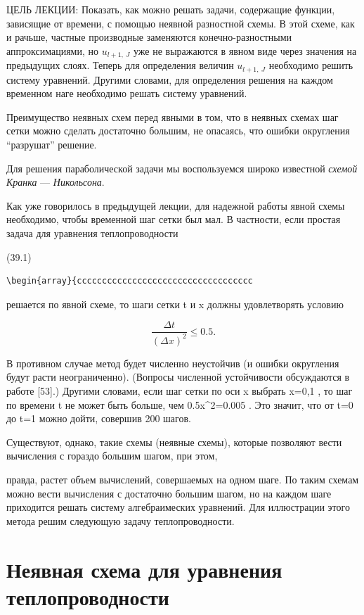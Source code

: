 \documentclass[
  ukrainian,
]{article}
\begin{document}
ЦЕЛЬ ЛЕКЦИИ: Показать, как можно решать задачи, содержащие функции,
зависящие от времени, с помощью неявной разностной схемы. В этой схеме,
как и рачьше, частные производные заменяются конечно-разностными
аппроксимациями, но \(u_{l+1,\ J}\) уже не выражаются в явном виде через
значения на предыдущих слоях. Теперь для определения величин
\(u_{l+1,\ J}\) необходимо решить систему уравнений. Другими словами,
для определения решения на каждом временном наге необходимо решать
систему уравнений.

Преимущество неявных схем перед явными в том, что в неявных схемах шаг
сетки можно сделать достаточно большим, не опасаясь, что ошибки
округления ``разрушат'' решение.

Для решения параболической задачи мы воспользуемся широко известной
\emph{схемой Кранка} --- \emph{Никольсона}.

Как уже говорилось в предыдущей лекции, для надежной работы явной схемы
необходимо, чтобы временной шаг сетки был мал. В частности, если простая
задача для уравнения теплопроводности

(39.1)

\begin{verbatim}
\begin{array}{ccccccccccccccccccccccccccccccccccc
\end{verbatim}

решается по явной схеме, то шаги сетки \Delta t и \Delta x должны
удовлетворять условию

\[
\frac{\Delta t}{(\Delta x)^2} \leqslant 0.5.
\]

В противном случае метод будет численно неустойчив (и ошибки округления
будут расти неограниченно). (Вопросы численной устойчивости обсуждаются
в работе {[}53{]}.) Другими словами, если шаг сетки по оси x выбрать
\Delta x=0,1 , то шаг по времени \Delta t не может быть больше, чем
0.5\Delta x\^{}2=0.005 . Это значит, что от t=0 до t=1 можно дойти,
совершив 200 шагов.

Существуют, однако, такие схемы (неявные схемы), которые позволяют вести
вычисления с гораздо большим шагом, при этом,

правда, растет объем вычислений, совершаемых на одном шаге. По таким
схемам можно вести вычисления с достаточно большим шагом, но на каждом
шаге приходится решать систему алгебраимеских уравнений. Для иллюстрации
этого метода решим следующую задачу теплопроводности.

\section{Неявная схема для уравнения
теплопроводности}\label{ux43dux435ux44fux432ux43dux430ux44f-ux441ux445ux435ux43cux430-ux434ux43bux44f-ux443ux440ux430ux432ux43dux435ux43dux438ux44f-ux442ux435ux43fux43bux43eux43fux440ux43eux432ux43eux434ux43dux43eux441ux442ux438}
\end{document}
